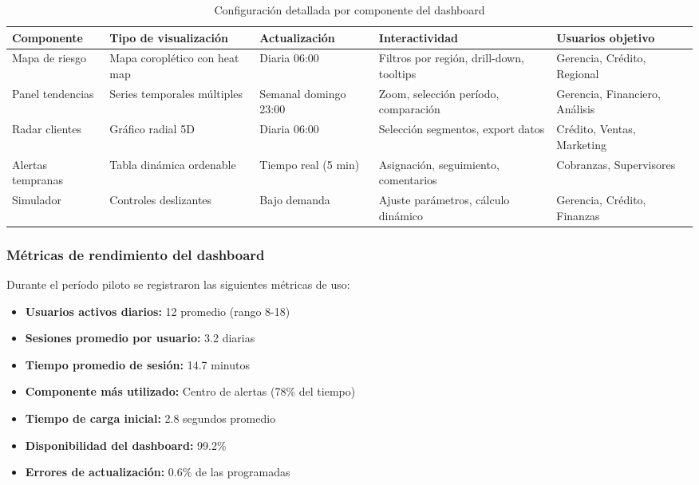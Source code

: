 \begin{table}[ht]
\centering
\begin{tabular}{|p{2.5cm}|p{2.5cm}|p{2.5cm}|p{3cm}|p{3cm}|}
\hline
\textbf{Componente} & \textbf{Tipo de visualización} & \textbf{Actualización} & \textbf{Interactividad} & \textbf{Usuarios objetivo} \\
\hline
Mapa de riesgo & Mapa coroplético con heat map & Diaria 06:00 & Filtros por región, drill-down, tooltips & Gerencia, Crédito, Regional \\
\hline
Panel tendencias & Series temporales múltiples & Semanal domingo 23:00 & Zoom, selección período, comparación & Gerencia, Financiero, Análisis \\
\hline
Radar clientes & Gráfico radial 5D & Diaria 06:00 & Selección segmentos, export datos & Crédito, Ventas, Marketing \\
\hline
Alertas tempranas & Tabla dinámica ordenable & Tiempo real (5 min) & Asignación, seguimiento, comentarios & Cobranzas, Supervisores \\
\hline
Simulador & Controles deslizantes & Bajo demanda & Ajuste parámetros, cálculo dinámico & Gerencia, Crédito, Finanzas \\
\hline
\end{tabular}
\caption{Configuración detallada por componente del dashboard}
\end{table}

\subsubsection{Métricas de rendimiento del dashboard}

Durante el período piloto se registraron las siguientes métricas de uso:

\begin{itemize}
    \item \textbf{Usuarios activos diarios:} 12 promedio (rango 8-18)
    \item \textbf{Sesiones promedio por usuario:} 3.2 diarias
    \item \textbf{Tiempo promedio de sesión:} 14.7 minutos
    \item \textbf{Componente más utilizado:} Centro de alertas (78\% del tiempo)
    \item \textbf{Tiempo de carga inicial:} 2.8 segundos promedio
    \item \textbf{Disponibilidad del dashboard:} 99.2\%
    \item \textbf{Errores de actualización:} 0.6\% de las programadas
\end{itemize}

